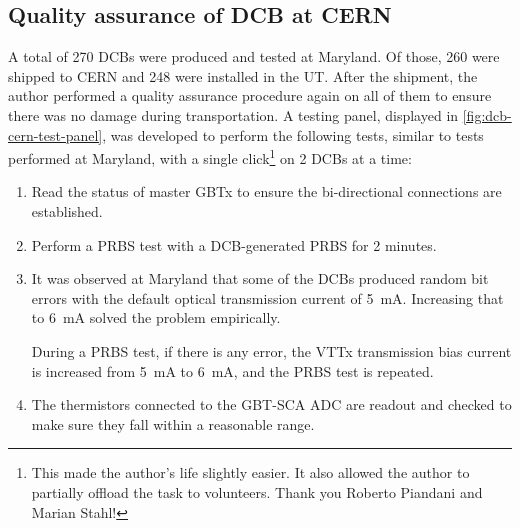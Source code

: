 \subsection{Quality assurance of DCB at CERN}
\label{dcb-qa}

A total of 270 DCBs were produced and tested at Maryland.
Of those, 260 were shipped to CERN and 248 were installed in the UT.
After the shipment, the author performed a quality assurance procedure again on
all of them to ensure there was no damage during transportation.
A testing panel,
displayed in \cref{fig:dcb-cern-test-panel},
was developed to perform the following tests,
similar to tests performed at Maryland,
with a single click\footnote{
    This made the author's life slightly easier.
    It also allowed the author to partially offload the task to volunteers.
    Thank you Roberto Piandani and Marian Stahl!
} on 2 DCBs at a time:

\begin{enumerate}
    \item Read the status of master GBTx to ensure the bi-directional
        connections are established.

    \item Perform a PRBS test with a DCB-generated PRBS for 2 minutes.
    \item
        It was observed at Maryland that some of the DCBs produced random bit
        errors with the default optical transmission current of 5~mA.
        Increasing that to 6~mA solved the problem empirically.

        During a PRBS test,
        if there is any error, the VTTx transmission bias current is
        increased from 5~mA to 6~mA, and the PRBS test is repeated.
    \item The thermistors connected to the GBT-SCA ADC are readout and checked
        to make sure they fall within a reasonable range.
\end{enumerate}

